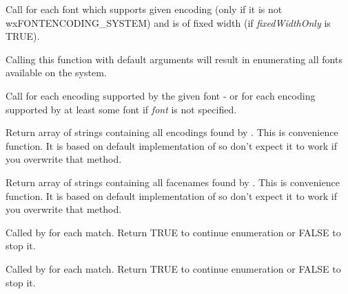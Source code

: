 \label{wxfontenumeratorenumeratefacenames}


Call  for each font which
supports given encoding (only if it is not wxFONTENCODING\_SYSTEM) and is of
fixed width (if {\it fixedWidthOnly} is TRUE).

Calling this function with default arguments will result in enumerating all
fonts available on the system.

\label{wxfontenumeratorenumerateencodings}


Call  for each
encoding supported by the given font - or for each encoding supported by at
least some font if {\it font} is not specified.


\label{wxfontenumeratorgetencodings}


Return array of strings containing all encodings found by 
. This is convenience function. It is 
based on default implementation of  so don't expect
it to work if you overwrite that method.

\label{wxfontenumeratorgetfacenames}


Return array of strings containing all facenames found by 
. This is convenience function. It is 
based on default implementation of  so don't expect
it to work if you overwrite that method.


\label{wxfontenumeratoronfacename}


Called by  for
each match. Return TRUE to continue enumeration or FALSE to stop it.

\label{wxfontenumeratoronfontencoding}


Called by  for
each match. Return TRUE to continue enumeration or FALSE to stop it.


